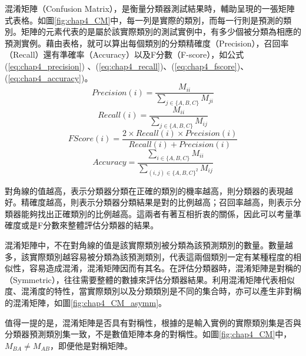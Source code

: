 混淆矩陣（Confusion Matrix），是衡量分類器測試結果時，輔助呈現的一張矩陣式表格。如圖\ref{fig:chap4_CM}中，每一列是實際的類別，而每一行則是預測的類別。矩陣的元素代表的是屬於該實際類別的測試實例中，有多少個被分類為相應的預測實例。藉由表格，就可以算出每個類別的分類精確度（Precision），召回率（Recall）還有準確率（Accuracy）以及F分數（F-score），如公式(\ref{eq:chap4_precision}) 、(\ref{eq:chap4_recall})、(\ref{eq:chap4_fscore})、(\ref{eq:chap4_accuracy})。
\begin{equation}\label{eq:chap4_precision}
Precision(i) = \frac{M_{ii}}{\sum_{j \in \{ A,B,C\}} M_{ji} } 
\end{equation}
\begin{equation}\label{eq:chap4_recall}
Recall(i) = \frac{M_{ii}}{\sum_{j \in \{ A,B,C\}} M_{ij} } 
\end{equation}
\begin{equation}\label{eq:chap4_fscore}
FScore(i) = \frac{2 \times Recall(i) \times Precision(i) }{ Recall(i) + Precision(i)} 
\end{equation}
\begin{equation}\label{eq:chap4_accuracy}
Accuracy = \frac{\sum_{i \in \{ A,B,C\}}M_{ii} }{ \sum_{(i,j) \in \{A,B,C\}^2} M_{ij} }
\end{equation}

對角線的值越高，表示分類器分類在正確的類別的機率越高，則分類器的表現越好。精確度越高，則表示分類器分類結果是對的比例越高；召回率越高，則表示分類器能夠找出正確類別的比例越高。這兩者有著互相折衷的關係，因此可以考量準確度或是F分數來整體評估分類器的結果。

混淆矩陣中，不在對角線的值是該實際類別被分類為該預測類別的數量。數量越多，該實際類別越容易被分類為該預測類別，代表這兩個類別一定有某種程度的相似性，容易造成混淆，混淆矩陣因而有其名。在評估分類器時，混淆矩陣是對稱的（Symmetric），往往需要整體的數據來評估分類器結果。利用混淆矩陣代表相似度、混淆度的特性，當實際類別以及分類類別是不同的集合時，亦可以產生非對稱的混淆矩陣，如圖\ref{fig:chap4_CM_asymm}。

值得一提的是，混淆矩陣是否具有對稱性，根據的是輸入實例的實際類別集是否與分類器預測類別集一致，不是數值矩陣本身的對稱性。如圖\ref{fig:chap4_CM}中，$M_{BA} \neq M_{AB}$，即便他是對稱矩陣。

